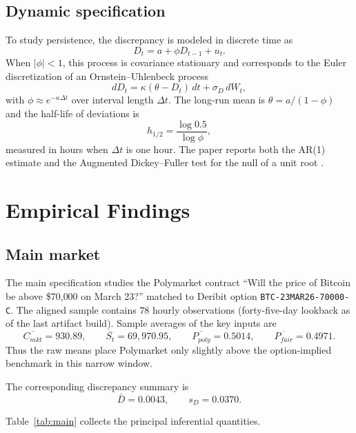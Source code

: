 \documentclass[11pt]{article}
\numberwithin{equation}{section}
\theoremstyle{plain}
\begin{document}
\subsection{Dynamic specification}
To study persistence, the discrepancy is modeled in discrete time as
\[
D_t = a + \phi D_{t-1} + u_t.
\]
When $|\phi|<1$, this process is covariance stationary and corresponds to the Euler discretization of an Ornstein--Uhlenbeck process
\[
dD_t = \kappa(\theta-D_t)\,dt + \sigma_D\,dW_t,
\]
with $\phi \approx e^{-\kappa \Delta t}$ over interval length $\Delta t$. The long-run mean is $\theta=a/(1-\phi)$ and the half-life of deviations is
\[
h_{1/2}=\frac{\log 0.5}{\log \phi},
\]
measured in hours when $\Delta t$ is one hour. The paper reports both the AR(1) estimate and the Augmented Dickey--Fuller test for the null of a unit root \citep{dickey1979}.

\section{Empirical Findings}
\subsection{Main market}
The main specification studies the Polymarket contract ``Will the price of Bitcoin be above \$70{,}000 on March 23?'' matched to Deribit option \texttt{BTC-23MAR26-70000-C}. The aligned sample contains $78$ hourly observations (forty-five-day lookback as of the last artifact build). Sample averages of the key inputs are
\[
\overline{C_{mkt}} = 930.89,
\qquad
\overline{S_t} = 69{,}970.95,
\qquad
\overline{P_{poly}} = 0.5014,
\qquad
\overline{P_{fair}} = 0.4971.
\]
Thus the raw means place Polymarket only slightly above the option-implied benchmark in this narrow window.

The corresponding discrepancy summary is
\[
\bar{D}=0.0043,
\qquad
s_D=0.0370.
\]

Table~\ref{tab:main} collects the principal inferential quantities.
\end{document}
